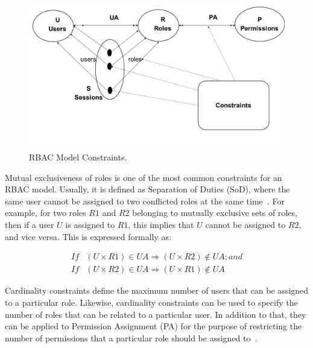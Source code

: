 \begin{figure}[bht]
\centering
\includegraphics[scale=0.26]{modelConstraints.png}
\caption{RBAC Model Constraints.}
\label{fig:RBACPol}
\end{figure}

Mutual exclusiveness of roles is one of the most common constraints for an RBAC model.  Usually, it is defined as Separation of Duties (SoD), where the same user cannot be assigned to two conflicted roles at the same time~\cite{FeKu2009}.  For example, for two roles $R1$ and $R2$ belonging to mutually exclusive sets of roles, then if a user $U$ is assigned to $R1$, this implies that $U$ cannot be assigned to $R2$, and vice versa.  This is expressed formally as:
  
 
\begin{align*} 
If&  (U \times R1) \in UA \Rightarrow  (U \times R2) \notin UA ;     and \\
If&  (U \times R2) \in UA \Rightarrow (U \times R1) \notin UA
\end{align*}    


Cardinality constraints define the maximum number of users that can be assigned to a particular role.  Likewise, cardinality constraints can be used to specify the number of roles that can be related to a particular user.  In addition to that, they can be applied to Permission Assignment (PA) for the purpose of restricting the number of permissions that a particular role should be assigned to~\cite{SDAG2008}.


